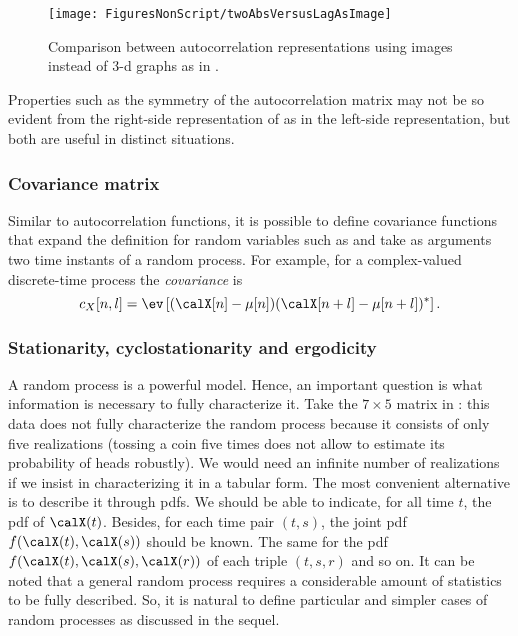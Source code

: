 \begin{figure}[htbp]
\centering
\texttt{[image: FiguresNonScript/twoAbsVersusLagAsImage]}
\caption{Comparison between autocorrelation representations using images instead of 3-d graphs as in .\label{fig:twoAbsVersusLagAsImage}}
\end{figure}

Properties such as the symmetry of the autocorrelation matrix may not be so evident from
the right-side representation of  as in the left-side
representation, but both are useful in distinct situations.
\eExample


\subsubsection{Covariance matrix}

Similar to autocorrelation functions, it is possible to define covariance functions that expand
the definition for random variables such as  and take as
arguments two time instants of a random process. For example, for a complex-valued discrete-time process the \emph{covariance} is
\begin{equation}
c_{X}[n,l] = \ev \left[(\calX[n] - \mu[n]) (\calX[n+l] - \mu[n+l])^* \right].
\label{eq:discreteTimeCovariance}
\end{equation}

\subsubsection{Stationarity, cyclostationarity and ergodicity}
\label{sec:stationarity}
A random process is a powerful model. Hence, an important question is what information is necessary to fully characterize it. Take the $7 \times 5$ matrix in : this data does not fully characterize the random process because it consists of only five realizations (tossing a coin five times does not allow to estimate its probability of heads robustly). We would need an infinite number of realizations if we insist in characterizing it in a tabular form. The most convenient alternative is to describe it through pdfs. We should be able to indicate, for all time $t$, the pdf of $\calX(t)$. Besides, for each time pair $(t,s)$, the joint pdf $f(\calX(t),\calX(s))$ should be known. The same for the pdf $f(\calX(t),\calX(s),\calX(r))$ of each triple $(t,s,r)$ and so on. It can be noted that a general random process requires a considerable amount of statistics to be fully described. So, it is natural to define particular and simpler cases of random processes as discussed in the sequel.

